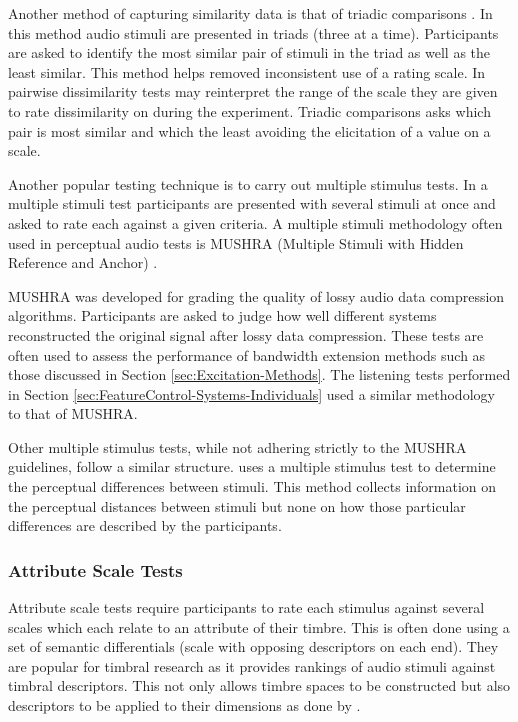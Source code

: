 			Another method of capturing similarity data is that of triadic comparisons
			\citep{wickelmaier2007deriving}.  In this method audio stimuli are presented in triads (three at a
			time).  Participants are asked to identify the most similar pair of stimuli in the triad as well as
			the least similar. This method helps removed inconsistent use of a rating scale. In pairwise
			dissimilarity tests may reinterpret the range of the scale they are given to rate dissimilarity on
			during the experiment. Triadic comparisons asks which pair is most similar and which the least
			avoiding the elicitation of a value on a scale.

			Another popular testing technique is to carry out multiple stimulus tests. In a multiple stimuli
			test participants are presented with several stimuli at once and asked to rate each against a given
			criteria. A multiple stimuli methodology often used in perceptual audio tests is MUSHRA (Multiple
			Stimuli with Hidden Reference and Anchor) \citep{mushra2014}. 

			MUSHRA was developed for grading the quality of lossy audio data compression algorithms.
			Participants are asked to judge how well different systems reconstructed the original signal after
			lossy data compression.  These tests are often used to assess the performance of bandwidth extension
			methods such as those discussed in Section \ref{sec:Excitation-Methods}. The listening tests
			performed in Section \ref{sec:FeatureControl-Systems-Individuals} used a similar methodology to that
			of MUSHRA.

			Other multiple stimulus tests, while not adhering strictly to the MUSHRA guidelines, follow a
			similar structure. \citet{arthi2015influence} uses a multiple stimulus test to determine the
			perceptual differences between stimuli. This method collects information on the perceptual distances
			between stimuli but none on how those particular differences are described by the participants.

		\subsubsection*{Attribute Scale Tests}
			Attribute scale tests require participants to rate each stimulus against several scales which each
			relate to an attribute of their timbre. This is often done using a set of semantic differentials
			(scale with opposing descriptors on each end). They are popular for timbral research as it provides
			rankings of audio stimuli against timbral descriptors. This not only allows timbre spaces to be
			constructed but also descriptors to be applied to their dimensions as done by
			\citet{zacharakis2014an}.

